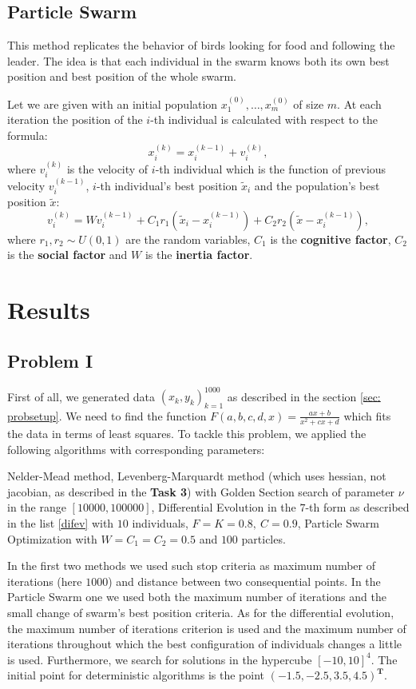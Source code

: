 \documentclass[12pt, bachelor, substylefile = algo_title.rtx]{disser}
\theoremstyle{definition}
\begin{document}
\subsection{Particle Swarm}
This method replicates the behavior of birds looking for food and following the leader. The idea is that each individual in the swarm knows both its own best position and best position of the whole swarm.

Let we are given with an initial population $x^{(0)}_1, \dots, x^{(0)}_m$ of size $m$. At each iteration the position of the $i$-th individual is calculated with respect to the formula: 
\[ x^{(k)}_i = x^{(k-1)}_i + v^{(k)}_i, \]
where $v^{(k)}_i$ is the velocity of $i$-th individual which is the function of previous velocity $v^{(k-1)}_i$, $i$-th individual's best position $\widetilde{x}_i$ and the population's best position $\widetilde{x}$:
\[ v^{(k)}_i =  W v^{(k-1)}_i + C_1 r_1 (\widetilde{x}_i - x^{(k-1)}_i) + C_2 r_2(\widetilde{x} - x^{(k-1)}_i),\]
where $r_1,r_2 \sim U(0, 1)$ are the random variables, $C_1$ is the \textbf{cognitive factor}, $C_2$ is the \textbf{social factor} and $W$ is the \textbf{inertia factor}.

\section{Results}
\subsection{Problem I}
First of all, we generated data $(x_k, y_k)_{k=1}^{1000}$ as described in the section \ref{sec: probsetup}. We need to find the function $F(a, b, c ,d, x) = \frac{ax+b}{x^2+cx+d}$ which fits the data in terms of least squares. To tackle this problem, we applied the following algorithms with corresponding parameters:
\begin{outline}
\1 Nelder-Mead method,
\1 Levenberg-Marquardt method (which uses hessian, not jacobian, as described in the \textbf{Task 3}) with Golden Section search of parameter $\nu$ in the range $[10000, 100000]$,
\1 Differential Evolution in the $7$-th form as described in the list \ref{difev} with $10$ individuals, $F = K = 0.8,\ C = 0.9$,
\1 Particle Swarm Optimization with $W = C_1 = C_2 = 0.5$ and $100$ particles.
\end{outline}
In the first two methods we used such stop criteria as maximum number of iterations (here $1000$) and distance between two consequential points. In the Particle Swarm one we used both the maximum number of iterations and the small change of swarm's best position criteria. As for the differential evolution, the maximum number of iterations criterion is used and the maximum number of iterations throughout which the best configuration of individuals changes a little is used. Furthermore, we search for solutions in the hypercube $[-10, 10]^4$. The initial point for deterministic algorithms is the point $(-1.5, -2.5, 3.5, 4.5)^{\mathbf{T}}$.
\end{document}
